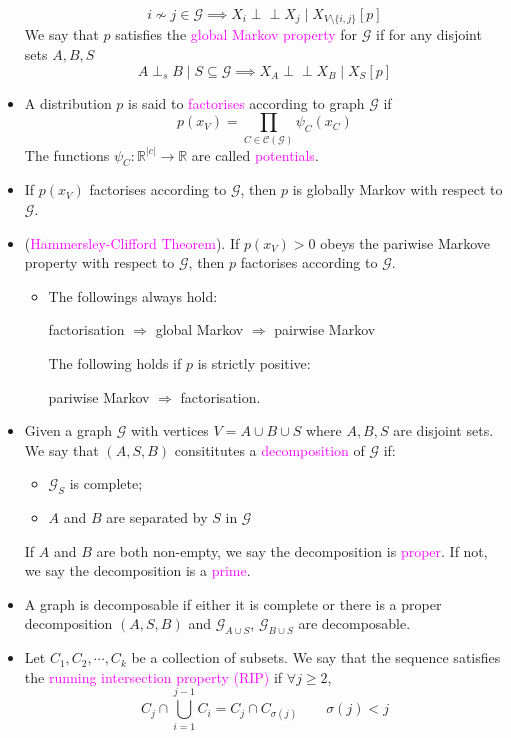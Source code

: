 \documentclass[UTF8]{book}
\newcommand{\perpp}{\ensuremath{\perp\!\!\!\!\!\perp}}
\newcommand{\concept}[1]{\textcolor{magenta}{#1}}
\begin{document}
\begin{itemize}
$$
i\not\sim j \in\mathcal{G} \implies X_i\perpp X_j\mid X_{V\setminus\{i,j\}}[p]
$$
We say that $p$ satisfies the \concept{global Markov property} for $\mathcal{G}$ if for any disjoint sets $A,B,S$
$$
A\perp_s B\mid S \subseteq\mathcal{G} \implies X_A\perpp X_B\mid X_S[p]
$$
\item A distribution $p$ is said to \concept{factorises} according to graph $\mathcal{G}$ if
$$
p(x_V) = \prod_{C\in\mathcal{C}(\mathcal{G})}\psi_C(x_C)
$$
The functions $\psi_C:\mathbb{R}^{|c|}\rightarrow \mathbb{R}$ are called \concept{potentials}.
\item If $p(x_V)$ factorises according to $\mathcal{G}$, then $p$ is globally Markov with respect to $\mathcal{G}$.
\item (\concept{Hammersley-Clifford Theorem}). If $p(x_V)>0$ obeys the pariwise Markove property with respect to $\mathcal{G}$, then $p$ factorises according to $\mathcal{G}$.
\begin{itemize}
	\item The followings always hold:
	\begin{center}
		factorisation $\Rightarrow$ global Markov $\Rightarrow$ pairwise Markov
	\end{center}
	The following holds if $p$ is strictly positive:
	\begin{center}
		pariwise Markov $\Rightarrow$ factorisation.
	\end{center}
\end{itemize}
\item Given a graph $\mathcal{G}$ with vertices $V=A\cup B\cup S$ where $A,B,S$ are disjoint sets. We say that $(A,S,B)$ consititutes a \concept{decomposition} of $\mathcal{G}$ if:
\begin{itemize}
	\item $\mathcal{G}_S$ is complete;
	\item $A$ and $B$ are separated by $S$ in $\mathcal{G}$
\end{itemize}
If $A$ and $B$ are both non-empty, we say the decomposition is \concept{proper}. If not, we say the decomposition is a \concept{prime}.
\item A graph is decomposable if either it is complete or there is a proper decomposition $(A,S,B)$ and $\mathcal{G}_{A\cup S}$, $\mathcal{G}_{B\cup S}$ are decomposable.
\item Let $C_1,C_2,\cdots,C_k$ be a collection of subsets. We say that the sequence satisfies the \concept{running intersection property (RIP)} if $\forall j\geq 2$,
$$
C_j\cap\bigcup_{i=1}^{j-1}C_i = C_j\cap C_{\sigma(j)} \qquad \sigma(j)<j
$$
\end{itemize}
\end{document}
